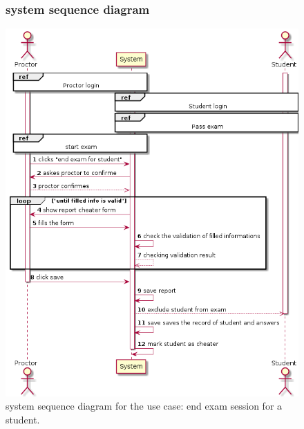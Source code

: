 \documentclass[]{uc2pfecaneva}
\begin{document}
\begin{figure}[h]
	\subsubsection{system sequence diagram}
	\centering
	\includegraphics[width=\textwidth]{images/End_exam_for_student}
	
	\caption{system sequence diagram for the use case: end exam session for a student.}
\end{figure}
\clearpage
\end{document}
